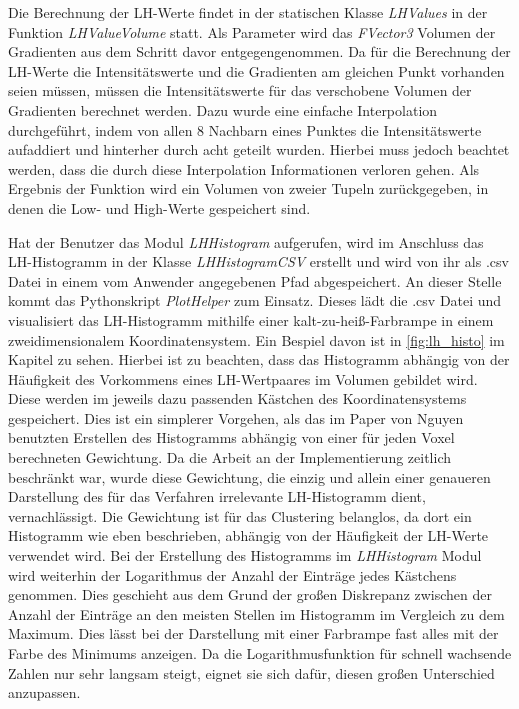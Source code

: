 Die Berechnung der LH-Werte findet in der statischen Klasse \textit{LHValues} in der Funktion \textit{LHValueVolume} statt. Als Parameter wird das \textit{FVector3} Volumen der Gradienten aus dem Schritt davor entgegengenommen.
\newline
Da für die Berechnung der LH-Werte die Intensitätswerte und die Gradienten am gleichen Punkt vorhanden seien müssen, müssen die Intensitätswerte für das verschobene Volumen der Gradienten berechnet werden. Dazu wurde eine einfache Interpolation durchgeführt, indem von allen 8 Nachbarn eines Punktes die Intensitätswerte aufaddiert und hinterher durch acht geteilt wurden. Hierbei muss jedoch beachtet werden, dass die durch diese Interpolation Informationen verloren gehen.
\newline
Als Ergebnis der Funktion wird ein Volumen von zweier Tupeln zurückgegeben, in denen die Low- und High-Werte gespeichert sind.


Hat der Benutzer das Modul \textit{LHHistogram} aufgerufen, wird im Anschluss das LH-Histogramm in der Klasse \textit{LHHistogramCSV} erstellt und wird von ihr als .csv Datei in einem vom Anwender angegebenen Pfad abgespeichert.
\newline
An dieser Stelle kommt das Pythonskript \textit{PlotHelper} zum Einsatz. Dieses lädt die .csv Datei und visualisiert das LH-Histogramm mithilfe einer kalt-zu-heiß-Farbrampe in einem zweidimensionalem Koordinatensystem.
\newline
Ein Bespiel davon ist in \autoref{fig:lh_histo} im Kapitel  zu sehen.
\newline
Hierbei ist zu beachten, dass das Histogramm abhängig von der Häufigkeit des Vorkommens eines LH-Wertpaares im Volumen gebildet wird. Diese werden im jeweils dazu passenden Kästchen des Koordinatensystems gespeichert.
\newline
Dies ist ein simplerer Vorgehen, als das im Paper von Nguyen \cite{nguyen2012clustering} benutzten Erstellen des Histogramms abhängig von einer für jeden Voxel berechneten Gewichtung.
\newline
Da die Arbeit an der Implementierung zeitlich beschränkt war, wurde diese Gewichtung, die einzig und allein einer genaueren Darstellung des für das Verfahren irrelevante LH-Histogramm dient, vernachlässigt. Die Gewichtung ist für das Clustering belanglos, da dort ein Histogramm wie eben beschrieben, abhängig von der Häufigkeit der LH-Werte verwendet wird.
\newline
Bei der Erstellung des Histogramms im \textit{LHHistogram} Modul wird weiterhin der Logarithmus der Anzahl der Einträge jedes Kästchens genommen. Dies geschieht aus dem Grund der großen Diskrepanz zwischen der Anzahl der Einträge an den meisten Stellen im Histogramm im Vergleich zu dem Maximum. Dies lässt bei der Darstellung mit einer Farbrampe fast alles mit der Farbe des Minimums anzeigen. Da die Logarithmusfunktion für schnell wachsende Zahlen nur sehr langsam steigt, eignet sie sich dafür, diesen großen Unterschied anzupassen.


